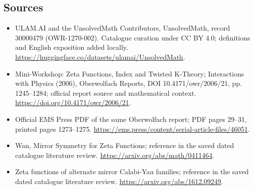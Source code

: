 \documentclass[11pt]{article}
\begin{document}
\subsection{Sources}
\begin{itemize}
\item[\hypertarget{source:30000479:1}{S1}] ULAM.AI and the UnsolvedMath Contributors, UnsolvedMath, record 30000479 (OWR-1270-002). Catalogue curation under CC BY 4.0; definitions and English exposition added locally.
\url{https://huggingface.co/datasets/ulamai/UnsolvedMath}.
\item[\hypertarget{source:30000479:2}{S2}] Mini-Workshop: Zeta Functions, Index and Twisted K-Theory; Interactions with Physics (2006), Oberwolfach Reports, DOI 10.4171/owr/2006/21, pp. 1245--1284; official report source and mathematical context.
\url{https://doi.org/10.4171/owr/2006/21}.
\item[\hypertarget{source:30000479:3}{S3}] Official EMS Press PDF of the same Oberwolfach report; PDF pages 29--31, printed pages 1273--1275.
\url{https://ems.press/content/serial-article-files/46051}.
\item[\hypertarget{source:30000479:4}{S4}] Wan, Mirror Symmetry for Zeta Functions; reference in the saved dated catalogue literature review.
\url{https://arxiv.org/abs/math/0411464}.
\item[\hypertarget{source:30000479:5}{S5}] Zeta functions of alternate mirror Calabi-Yau families; reference in the saved dated catalogue literature review.
\url{https://arxiv.org/abs/1612.09249}.
\end{itemize}
\label{end:30000479}
\end{document}
